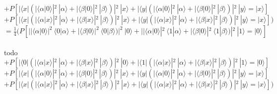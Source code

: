 \documentclass[a4paper]{scrartcl}
\begin{document}
\begin{enumerate}[a)]
$+ P[|\langle x| (|\langle \alpha|0\rangle|^2~|\alpha\rangle + |\langle \beta|0\rangle|^2~|\beta\rangle)|^2~|x\rangle + |\langle y| (|\langle \alpha|0\rangle|^2~|\alpha\rangle + |\langle \beta|0\rangle|^2~|\beta\rangle)|^2~|y\rangle =|x\rangle]$\\
$+ P[|\langle x| (|\langle \alpha|x\rangle|^2~|\alpha\rangle + |\langle \beta|x\rangle|^2~|\beta\rangle)|^2~|x\rangle + |\langle y| (|\langle \alpha|x\rangle|^2~|\alpha\rangle + |\langle \beta|x\rangle|^2~|\beta\rangle)|^2~|y\rangle =|x\rangle])$\\
$=\frac{1}{4} (P[||\langle \alpha|0\rangle|^2~\langle 0|\alpha\rangle + |\langle \beta|0\rangle|^2~\langle 0|\beta\rangle)|^2~|0\rangle + ||\langle \alpha|0\rangle|^2~\langle 1|\alpha\rangle + |\langle \beta|0\rangle|^2~\langle 1|\beta\rangle)|^2~|1\rangle=|0\rangle]$\\\\
todo
$+ P[|\langle 0|(|\langle \alpha|x\rangle|^2~|\alpha\rangle + |\langle \beta|x\rangle|^2~|\beta\rangle)|^2~|0\rangle + |\langle 1|(|\langle \alpha|x\rangle|^2~|\alpha\rangle + |\langle \beta|x\rangle|^2~|\beta\rangle)|^2~|1\rangle =|0\rangle]$\\
$+ P[|\langle x| (|\langle \alpha|0\rangle|^2~|\alpha\rangle + |\langle \beta|0\rangle|^2~|\beta\rangle)|^2~|x\rangle + |\langle y| (|\langle \alpha|0\rangle|^2~|\alpha\rangle + |\langle \beta|0\rangle|^2~|\beta\rangle)|^2~|y\rangle =|x\rangle]$\\
$+ P[|\langle x| (|\langle \alpha|x\rangle|^2~|\alpha\rangle + |\langle \beta|x\rangle|^2~|\beta\rangle)|^2~|x\rangle + |\langle y| (|\langle \alpha|x\rangle|^2~|\alpha\rangle + |\langle \beta|x\rangle|^2~|\beta\rangle)|^2~|y\rangle =|x\rangle])$\\




\end{enumerate}
\end{document}
